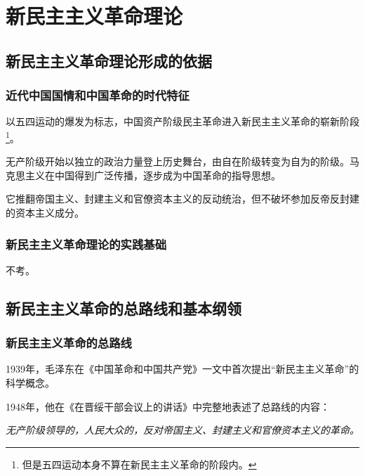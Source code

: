 \chapter{新民主主义革命理论}

\section{新民主主义革命理论形成的依据}

\subsection{近代中国国情和中国革命的时代特征}
以五四运动的爆发为标志，中国资产阶级民主革命进入新民主主义革命的崭新阶段\footnote{但是五四运动本身不算在新民主主义革命的阶段内。}。

无产阶级开始以独立的政治力量登上历史舞台，由自在阶级转变为自为的阶级。马克思主义在中国得到广泛传播，逐步成为中国革命的指导思想。

它推翻帝国主义、封建主义和官僚资本主义的反动统治，但不破坏参加反帝反封建的资本主义成分。

\subsection{新民主主义革命理论的实践基础}
不考。

\section{新民主主义革命的总路线和基本纲领}

\subsection{新民主主义革命的总路线}
1939年，毛泽东在《中国革命和中国共产党》一文中首次提出“新民主主义革命”的科学概念。

1948年，他在《在晋绥干部会议上的讲话》中完整地表述了总路线的内容：

\begin{center}
    \textit{无产阶级领导的，人民大众的，反对帝国主义、封建主义和官僚资本主义的革命。}
\end{center}

